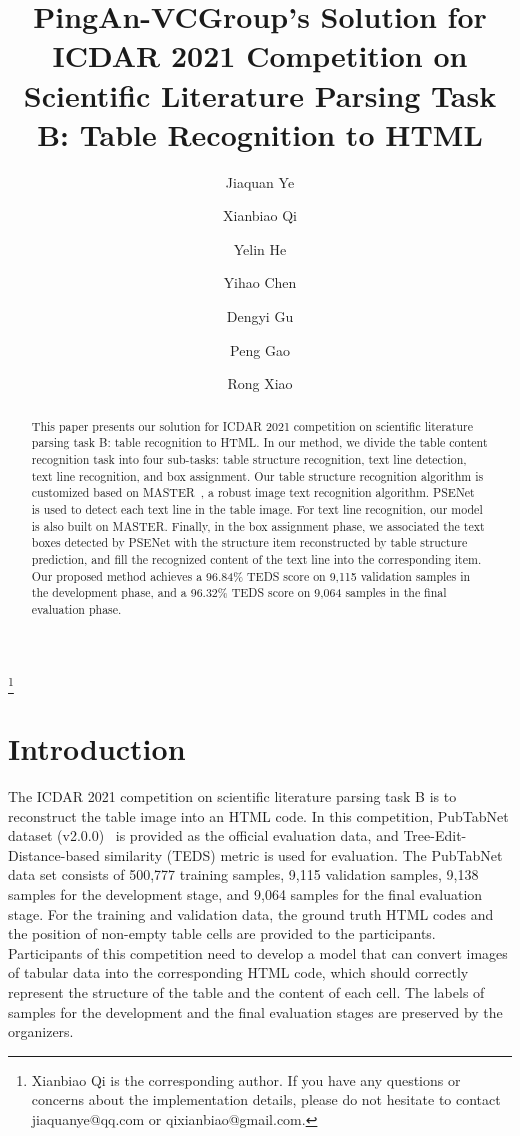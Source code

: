 \documentclass{article}
\begin{document}
\title{PingAn-VCGroup's Solution for ICDAR 2021 Competition on Scientific Literature Parsing Task B: Table Recognition to HTML}


\author[1]{Jiaquan Ye}
\author[1]{Xianbiao Qi}
\author[1]{Yelin He}
\author[1]{Yihao Chen}
\author[1]{Dengyi Gu}
\author[2]{Peng Gao}
\author[1]{Rong Xiao}

\thanks{Xianbiao Qi is the corresponding author. If you have any questions or concerns about the implementation details, please do not hesitate to contact jiaquanye@qq.com or qixianbiao@gmail.com.}




\maketitle
\begin{abstract}
This paper presents our solution for ICDAR 2021 competition on scientific literature parsing task B: table recognition to HTML. In our method, we divide the table content recognition task into four sub-tasks: table structure recognition, text line detection, text line recognition, and box assignment. Our table structure recognition algorithm is customized based on MASTER~\cite{lu2019master}, a robust image text recognition algorithm. PSENet~\cite{wang2019shape} is used to detect each text line in the table image. For text line recognition, our model is also built on MASTER. 
Finally, in the box assignment phase, we associated the text boxes detected by PSENet with the structure item reconstructed by table structure prediction, and fill the recognized content of the text line into the corresponding item. Our proposed method achieves a 96.84\% TEDS score on 9,115 validation samples in the development phase, and a 96.32\% TEDS score on 9,064 samples in the final evaluation phase. 
\end{abstract}





\section{Introduction}
The ICDAR 2021 competition on scientific literature parsing task B is to reconstruct the table image into an HTML code. In this competition, PubTabNet dataset (v2.0.0)~\cite{zhong2019image} is provided as the official evaluation data, and Tree-Edit-Distance-based similarity (TEDS) metric is used for evaluation. The PubTabNet data set consists of 500,777 training samples, 9,115 validation samples, 9,138 samples for the development stage, and 9,064 samples for the final evaluation stage. For the training and validation data, the ground truth HTML codes and the position of non-empty table cells are provided to the participants. Participants of this competition need to develop a model that can convert images of tabular data into the corresponding HTML code, which should correctly represent the structure of the table and the content of each cell. The labels of samples for the development and the final evaluation stages are preserved by the organizers.
\end{document}
